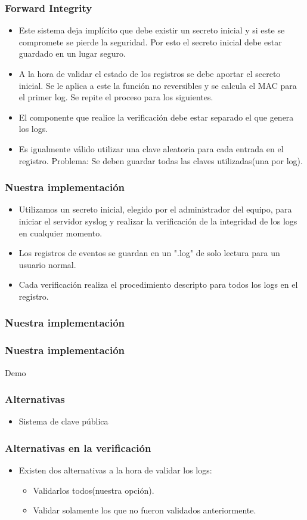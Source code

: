 \documentclass[10pt, a4paper,english,spanish]{beamer}
\begin{document}
\begin{frame}
\frametitle{Forward Integrity}
\begin{itemize}
\item Este sistema deja implícito que debe existir un secreto inicial y si este se compromete se pierde la
seguridad. Por esto el secreto inicial debe estar guardado en un lugar seguro.
\item A la hora de validar el estado de los registros se debe aportar el secreto inicial. Se le aplica a
este la función no reversibles y se calcula el MAC para el primer log. Se repite el proceso para los
siguientes.
\item El componente que realice la verificación debe estar separado el que genera los logs.
\item Es igualmente válido utilizar una clave aleatoria para cada entrada en el registro. Problema:
Se deben guardar todas las claves utilizadas(una por log).

\end{itemize}
\end{frame}

\begin{frame}
\frametitle{Nuestra implementación}
\begin{itemize}
\item Utilizamos un secreto inicial, elegido por el administrador del equipo, para iniciar el servidor syslog
y realizar la verificación de la integridad de los logs en cualquier momento.
\item Los registros de eventos se guardan en un ".log" de solo lectura para un usuario normal.
\item Cada verificación realiza el procedimiento descripto para todos los logs en el registro.
\end{itemize}
\end{frame}

\begin{frame}
\frametitle{Nuestra implementación}
\end{frame}

\begin{frame}
\frametitle{Nuestra implementación}
Demo
\end{frame}

\begin{frame}
\frametitle{Alternativas}
\begin{itemize}
\item Sistema de clave pública
\end{itemize}
\end{frame}

\begin{frame}
\frametitle{Alternativas en la verificación}
\begin{itemize}
\item Existen dos alternativas a la hora de validar los logs:
\begin{itemize}
\item Validarlos todos(nuestra opción).
\item Validar solamente los que no fueron validados anteriormente.
\end{itemize}
\end{itemize}
\end{frame}
\end{document}
